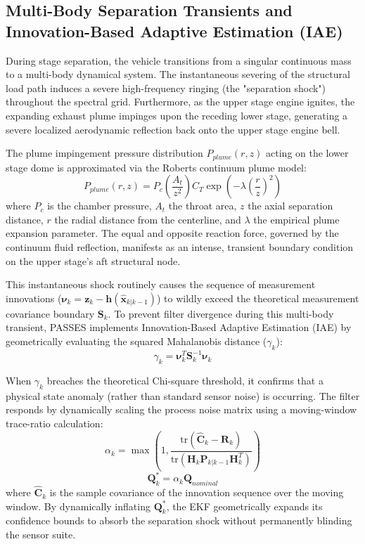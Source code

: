 \documentclass[11pt,a4paper]{article}
\theoremstyle{definition}
\numberwithin{equation}{section}
\begin{document}
\subsection{Multi-Body Separation Transients and Innovation-Based Adaptive Estimation (IAE)}

During stage separation, the vehicle transitions from a singular continuous mass to a multi-body dynamical system. The instantaneous severing of the structural load path induces a severe high-frequency ringing (the "separation shock") throughout the spectral grid. Furthermore, as the upper stage engine ignites, the expanding exhaust plume impinges upon the receding lower stage, generating a severe localized aerodynamic reflection back onto the upper stage engine bell. 

The plume impingement pressure distribution $P_{plume}(r, z)$ acting on the lower stage dome is approximated via the Roberts continuum plume model:
\begin{equation}
    P_{plume}(r, z) = P_c \left( \frac{A_t}{z^2} \right) C_T \exp\left(-\lambda \left(\frac{r}{z}\right)^2\right)
\end{equation}
where $P_c$ is the chamber pressure, $A_t$ the throat area, $z$ the axial separation distance, $r$ the radial distance from the centerline, and $\lambda$ the empirical plume expansion parameter. The equal and opposite reaction force, governed by the continuum fluid reflection, manifests as an intense, transient boundary condition on the upper stage's aft structural node. 

This instantaneous shock routinely causes the sequence of measurement innovations ($\boldsymbol{\nu}_k = \mathbf{z}_k - \mathbf{h}(\hat{\mathbf{x}}_{k|k-1})$) to wildly exceed the theoretical measurement covariance boundary $\mathbf{S}_k$. To prevent filter divergence during this multi-body transient, PASSES implements Innovation-Based Adaptive Estimation (IAE) by geometrically evaluating the squared Mahalanobis distance ($\gamma_k$):
\begin{equation}
    \gamma_k = \boldsymbol{\nu}_k^T \mathbf{S}_k^{-1} \boldsymbol{\nu}_k
\end{equation}

When $\gamma_k$ breaches the theoretical Chi-square threshold, it confirms that a physical state anomaly (rather than standard sensor noise) is occurring. The filter responds by dynamically scaling the process noise matrix using a moving-window trace-ratio calculation:
\begin{equation}
    \alpha_k = \max \left(1, \frac{\text{tr}(\hat{\mathbf{C}}_k - \mathbf{R}_k)}{\text{tr}(\mathbf{H}_k \mathbf{P}_{k|k-1}\mathbf{H}_k^T)} \right)
\end{equation}
\begin{equation}
    \mathbf{Q}_{k}^* = \alpha_k \mathbf{Q}_{nominal}
\end{equation}
where $\hat{\mathbf{C}}_k$ is the sample covariance of the innovation sequence over the moving window. By dynamically inflating $\mathbf{Q}_{k}^*$, the EKF geometrically expands its confidence bounds to absorb the separation shock without permanently blinding the sensor suite.
\end{document}
